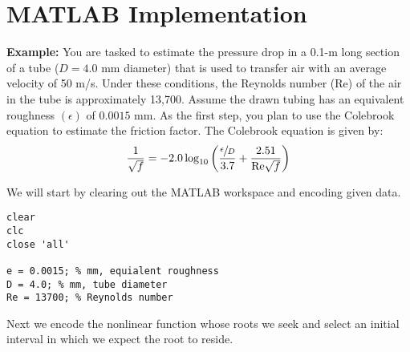 \section{MATLAB Implementation}

\textbf{Example:} You are tasked to estimate the pressure drop in a 0.1-m long section of a tube ($D=4.0$ mm diameter) that is used to transfer air with an average velocity of 50 m/s.  Under these conditions, the Reynolds number (Re) of the air in the tube is approximately 13,700.  Assume the drawn tubing has an equivalent roughness $(\epsilon)$ of $0.0015$ mm.  As the first step, you plan to use the Colebrook equation to estimate the friction factor.  The Colebrook equation is given by:
\begin{equation*}
\frac{1}{\sqrt{f}} = -2.0 \log_{10}\left(\frac{\sfrac{\epsilon}{D}}{3.7} + \frac{2.51}{\text{Re}\sqrt{f}} \right)
\end{equation*}

We will start by clearing out the MATLAB workspace and encoding given data.
\begin{lstlisting}[name=lec3n-ex,style=myMatlab]
clear
clc
close 'all'

e = 0.0015; % mm, equialent roughness
D = 4.0; % mm, tube diameter
Re = 13700; % Reynolds number
\end{lstlisting}
Next we encode the nonlinear function whose roots we seek and select an initial interval in which we expect the root to reside.

